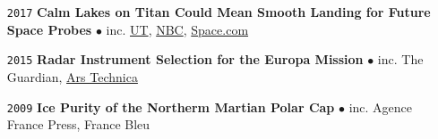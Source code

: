 \begin{itemize}[leftmargin=3.8em, labelsep=1.5em]
    \item[\texttt{2017}] \textbf{Calm Lakes on Titan Could Mean Smooth Landing for Future Space Probes} $\bullet$ inc. \href{https://news.utexas.edu/2017/07/06/calm-lakes-on-titan/}{UT}, \href{https://www.nbcnews.com/mach/science/you-can-forget-about-surfing-saturn-s-moon-titan-here-ncna780711}{NBC}, \href{https://www.space.com/37417-saturn-moon-titan-calm-seas-cassini.html}{Space.com}
    
    \item[\texttt{2015}] \textbf{Radar Instrument Selection for the Europa Mission} $\bullet$ inc. The Guardian, \href{https://arstechnica.com/science/2015/11/attempt-no-landing-there-yeah-right-were-going-to-europa/}{Ars Technica}
    \item[\texttt{2009}] \textbf{Ice Purity of the Northerm Martian Polar Cap} $\bullet$ inc. Agence France Press, France Bleu
    
\end{itemize}